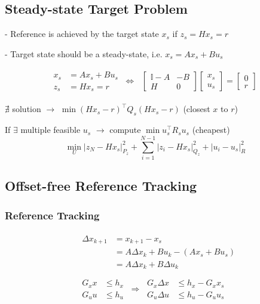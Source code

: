 
\subsection{Steady-state Target Problem}

- Reference is achieved by the target
state $x_s$ if $z_s = Hx_s = r$

- Target state should be a steady-state,
i.e. $x_s = Ax_s + Bu_s$

\begin{align*}
	\begin{aligned}
		x_s & = Ax_s + Bu_s \\
		z_s & = Hx_s = r
	\end{aligned}
	\ \Longleftrightarrow \
	\begin{aligned}
		\begin{bmatrix}
			\mathbb{I} - A & -B \\
			H              & 0
		\end{bmatrix}
		\begin{bmatrix}
			x_s \\
			u_s
		\end{bmatrix}
		=
		\begin{bmatrix}
			0 \\
			r
		\end{bmatrix}
	\end{aligned}
\end{align*}

$\nexists$ solution
$\rightarrow$
$\min (Hx_s - r)^\top Q_s (H x_s - r)$
(closest $x$ to $r$)

If $\exists$ multiple feasible $u_s$
$\rightarrow$
compute
$\min u_s^\top R_s u_s$
(cheapest)
\[
	\min_U |z_N - Hx_s|_{P_z}^2
	\!+\! \sum_{i=1}^{N-1} | z_i - Hx_s |_{Q_z}^2
	+ | u_i - u_s |_{R}^2
\]

\subsection{Offset-free Reference Tracking}

\subsubsection{Reference Tracking}

\begin{align*}
	 &
	\begin{aligned}
		\Delta x_{k+1}
		 & = x_{k+1} -x_s                          \\
		 & = A\Delta x_k + B u_k - (A x_s + B u_s) \\
		 & = A\Delta x_k + B\Delta u_k             \\
	\end{aligned}
	\\&
	\begin{aligned}
		G_x  x & \leq h_x \\
		G_u  u & \leq h_u
	\end{aligned}
	\ \Rightarrow \
	\begin{aligned}
		G_x \Delta x & \leq h_x - G_x x_s \\
		G_u \Delta u & \leq h_u - G_u u_s
	\end{aligned}
\end{align*}

